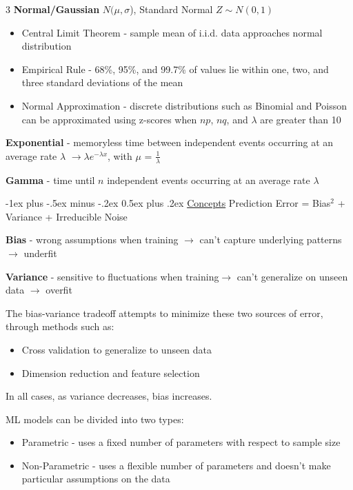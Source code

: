\documentclass[10pt,landscape,letterpaper]{article}
\makeatletter
\renewcommand{\section}{\@startsection{section}{1}{0mm}%
                                {-1ex plus -.5ex minus -.2ex}%
                                {0.5ex plus .2ex}%
                                {\normalfont\large\bfseries}}
\makeatother
\begin{document}
\begin{multicols}{3}
\textbf{Normal/Gaussian} $N(\mu,\sigma$), Standard Normal $Z\sim N(0, 1)$

\begin{itemize}[label={--},leftmargin=4mm]
\itemsep -.4mm
\vspace{-.5mm}
\item Central Limit Theorem - sample mean of i.i.d. data approaches normal distribution
\item Empirical Rule - 68\%, 95\%, and 99.7\% of values lie within one, two, and three standard deviations of the mean
\item Normal Approximation - discrete distributions such as Binomial and Poisson can be approximated using z-scores when $np$, $nq$, and $\lambda$ are greater than 10
\end{itemize}

\textbf{Exponential} - memoryless time between independent events occurring at an average rate $\lambda$ $\to \lambda e^{-\lambda x}$, with $\mu$ = $\frac{1}{\lambda}$

\textbf{Gamma} - time until $n$ independent events occurring at an average rate $\lambda$

\section{\href{https://migue-rc.github.io/Data-Science-Cheatsheet/\#Concepts}{Concepts}}
Prediction Error = Bias$^2$ + Variance + Irreducible Noise

\textbf{Bias} - wrong assumptions when training $\to$ can't capture underlying patterns $\to$ underfit

\textbf{Variance} - sensitive to fluctuations when training$\to$ can't generalize on unseen data $\to$ overfit

The bias-variance tradeoff attempts to minimize these two sources of error, through methods such as:
\begin{itemize}[label={--},leftmargin=4mm]
\itemsep -.4mm
\vspace{-.5mm}
\item Cross validation to generalize to unseen data
\item Dimension reduction and feature selection
\end{itemize}
\vspace{-.5mm}
In all cases, as variance decreases, bias increases.

\vspace{.5mm}
ML models can be divided into two types:
\vspace{-.5mm}
\begin{itemize}[label={--},leftmargin=4mm]
    \itemsep -.4mm
    \item Parametric - uses a fixed number of parameters with respect to sample size
    \item Non-Parametric - uses a flexible number of parameters and doesn't make particular assumptions on the data
\end{itemize}


\end{multicols}
\end{document}
